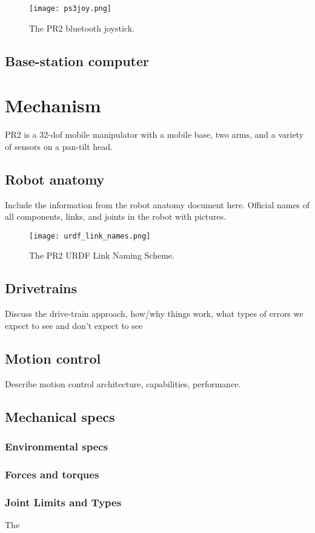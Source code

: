 \begin{figure}[h]
\centering
\texttt{[image: ps3joy.png]}
\caption{The PR2 bluetooth joystick.}
\label{fig:ps3joy}
\end{figure}

\subsection{Base-station computer}
\section{Mechanism}
PR2 is a 32-dof mobile manipulator with a mobile base, two arms, and a variety of sensors on a pan-tilt head.
\subsection{Robot anatomy}
Include the information from the robot anatomy document here.  Official names of all components, links, and joints in the robot with pictures.

\begin{figure}[h]
\centering
\texttt{[image: urdf\_link\_names.png]}
\caption{The PR2 URDF Link Naming Scheme.}
\label{fig:urdf_link_names}
\end{figure}

\subsection{Drivetrains}
Discuss the drive-train approach, how/why things work, what types of errors we expect to see and don't expect to see
\subsection{Motion control}
Describe motion control architecture, capabilities, performance.
\subsection{Mechanical specs}
\subsubsection{Environmental specs}
\subsubsection{Forces and torques}
\subsubsection{Joint Limits and Types}
The 

